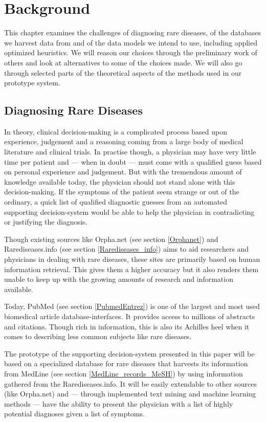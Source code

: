 \chapter{Background\label{Background}}

This chapter examines the challenges of diagnosing rare diseases, of
the databases we harvest data from and of the data models we intend to
use, including applied optimized heuristics. We will reason our
choices through the preliminary work of others and look at
alternatives to some of the choices made. We will also go through
selected parts of the theoretical aspects of the methods used in our prototype
system.

\section{Diagnosing Rare Diseases}

In theory, clinical decision-making is a complicated process based upon
experience, judgement and a reasoning coming from a large body of
medical literature and clinical trials. In practise though, a
physician may have very little time per patient and --- when in doubt
--- must come with a qualified guess based on personal experience and
judgement. But with the tremendous amount of knowledge available today, the
physician should not stand alone with this decision-making. If the
symptoms of the patient seem strange or out of the ordinary, a quick
list of qualified diagnostic guesses from an automated supporting
decision-system would be able to help the physician in contradicting or
justifying the diagnosis.

Though existing sources like Orpha.net (see section
\ref{Orphanet}) and Rarediseases.info (see section
\ref{Rarediseases_info}) aims to aid researchers and physicians in
dealing with rare diseases, these sites are primarily based on human
information retrieval. This gives them a higher accuracy
 but it
also renders them unable to keep up with the growing amounts of
research and information available.

Today, PubMed (see section \ref{PubmedEntrez}) is one of the largest and most used
biomedical article database-interfaces. It provides access to millions
of abstracts and citations. Though rich in information, this is
also its Achilles heel when it comes to describing less common
subjects like rare diseases.

The prototype of the supporting decision-system presented in this
paper will be based on a specialized database for rare diseases that
harvests its information from MedLine (see section
\ref{MedLine_records_MeSH}) by using information gathered from the
Rarediseases.info. It will be easily extendable to other sources (like
Orpha.net) and --- through implemented text mining and machine
learning methods --- have the ability to present the physician with a
list of highly potential diagnoses given a list of symptoms.


